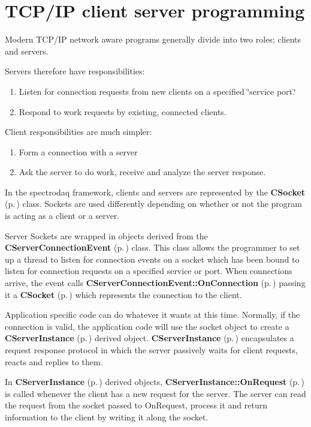 \section{TCP/IP client server programming}\label{TCPIP}


Modern TCP/IP network aware programs generally divide into two roles; clients and servers.

Servers therefore have responsibilities:\begin{enumerate}
\item 
Listen for connection requests from new clients on a specified \char`\"{}service port.\char`\"{}\item 
Respond to work requests by existing, connected clients.\end{enumerate}
Client responsibilities are much simpler:\begin{enumerate}
\item 
Form a connection with a server\item 
Ask the server to do work, receive and analyze the server response.\end{enumerate}
In the spectrodaq framework, clients and servers are represented by the {\bf CSocket} {\rm (p.\,\pageref{classCSocket})} class. Sockets are used differently depending on whether or not the program is acting as a client or a server.

Server Sockets are wrapped in objects derived from the {\bf CServer\-Connection\-Event} {\rm (p.\,\pageref{classCServerConnectionEvent})}  class. This class allows the programmer to set up a thread to listen for  connection events on a socket which has been bound to listen for connection requests on a specified service or port. When connections arrive, the event calls {\bf CServer\-Connection\-Event::On\-Connection} {\rm (p.\,\pageref{classCServerConnectionEvent_a12})} passing it a {\bf CSocket} {\rm (p.\,\pageref{classCSocket})} which represents the connection to the client.

Application specific code can do whatever it wants at this time.  Normally, if the connection is valid, the application code will use the socket object to create a {\bf CServer\-Instance} {\rm (p.\,\pageref{classCServerInstance})} derived object. {\bf CServer\-Instance} {\rm (p.\,\pageref{classCServerInstance})}  encapsulates a request response protocol in which the server passively waits for client requests, reacts and replies to them.

In {\bf CServer\-Instance} {\rm (p.\,\pageref{classCServerInstance})} derived objects, {\bf CServer\-Instance::On\-Request} {\rm (p.\,\pageref{classCServerInstance_a9})} is called whenever the client has a new request for the server. The server can read the request from the socket passed to On\-Request, process it and return information to the client by writing it along the socket.

